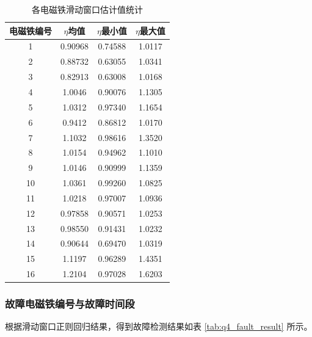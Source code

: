 \documentclass[a4paper]{nmmcm}
\begin{document}
\FloatBarrier
\begin{table}[H]
\centering
\caption{各电磁铁滑动窗口估计值统计}
\label{tab:q4_eta_stat}
\small
\setlength{\tabcolsep}{8pt}
\renewcommand{\arraystretch}{1.18}
\begin{tabular}{c c c c}
\toprule
电磁铁编号 & $\eta$均值 & $\eta$最小值 & $\eta$最大值 \\
\midrule
1  & 0.90968 & 0.74588 & 1.0117 \\
2  & 0.88732 & 0.63055 & 1.0341 \\
3  & 0.82913 & 0.63008 & 1.0168 \\
4  & 1.0046  & 0.90076 & 1.1305 \\
5  & 1.0312  & 0.97340 & 1.1654 \\
6  & 0.9412  & 0.86812 & 1.0170 \\
7  & 1.1032  & 0.98616 & 1.3520 \\
8  & 1.0154  & 0.94962 & 1.1010 \\
9  & 1.0146  & 0.90999 & 1.1359 \\
10 & 1.0361  & 0.99260 & 1.0825 \\
11 & 1.0218  & 0.97007 & 1.0936 \\
12 & 0.97858 & 0.90571 & 1.0253 \\
13 & 0.98550 & 0.91431 & 1.0232 \\
14 & 0.90644 & 0.69470 & 1.0319 \\
15 & 1.1197  & 0.96289 & 1.4351 \\
16 & 1.2104  & 0.97028 & 1.6203 \\
\bottomrule
\end{tabular}
\end{table}
\FloatBarrier

\subsubsection{故障电磁铁编号与故障时间段}

根据滑动窗口正则回归结果，得到故障检测结果如表 \ref{tab:q4_fault_result} 所示。
\end{document}
